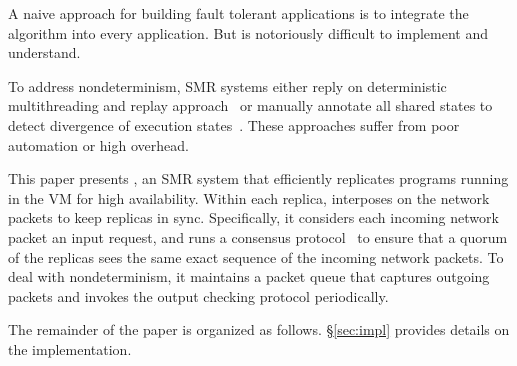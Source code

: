 A naive approach for building fault tolerant applications is to integrate the \paxos algorithm 
into every application. But \paxos is notoriously difficult to implement and understand.

To address nondeterminism, SMR systems either reply on deterministic multithreading and replay 
approach~\cite{rex:eurosys14} or manually annotate all shared states to detect divergence of execution 
states~\cite{eve:osdi12}. These approaches suffer from poor automation or high overhead.


This paper presents \xxx, an SMR system that efficiently replicates programs running in the 
VM for high availability. Within each replica, \xxx interposes on the network packets to keep 
replicas in sync. Specifically, it considers each incoming network packet an input request, and runs 
a \paxos consensus protocol~\cite{paxos:practical} to ensure that a quorum of the replicas sees the 
same exact sequence of the incoming network packets. To deal with nondeterminism, it maintains a 
packet queue that captures outgoing packets and invokes the output checking protocol periodically.

The remainder of the paper is organized as follows. \S\ref{sec:impl} provides details on the 
implementation.
